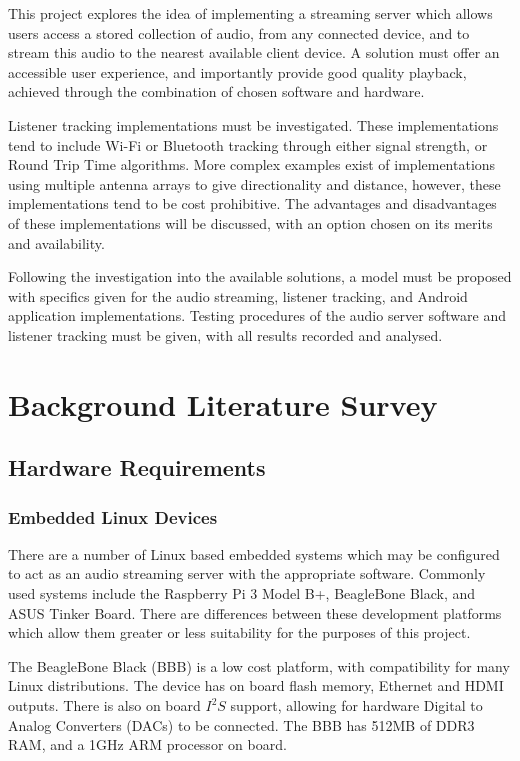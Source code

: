 \documentclass[11pt,a4paper,headinclude=false,footinclude=false]{scrreprt}
\begin{document}
This project explores the idea of implementing a streaming server which
allows users access a stored collection of audio, from any connected
device, and to stream this audio to the nearest available client device.
A solution must offer an accessible user experience, and importantly
provide good quality playback, achieved through the combination of
chosen software and hardware.

Listener tracking implementations must be investigated. These
implementations tend to include Wi-Fi or Bluetooth tracking through
either signal strength, or Round Trip Time algorithms. More complex
examples exist of implementations using multiple antenna arrays to give
directionality and distance, however, these implementations tend to be
cost prohibitive. The advantages and disadvantages of these
implementations will be discussed, with an option chosen on its merits
and availability.

Following the investigation into the available solutions, a model must
be proposed with specifics given for the audio streaming, listener
tracking, and Android application implementations. Testing procedures of
the audio server software and listener tracking must be given, with all
results recorded and analysed.

\chapter{Background Literature
Survey}\label{background-literature-survey}

\section{Hardware Requirements}\label{hardware-requirements}

\subsection{Embedded Linux Devices}\label{embedded-linux-devices}

There are a number of Linux based embedded systems which may be
configured to act as an audio streaming server with the appropriate
software. Commonly used systems include the Raspberry Pi 3 Model B+,
BeagleBone Black, and ASUS Tinker Board. There are differences between
these development platforms which allow them greater or less suitability
for the purposes of this project.

The BeagleBone Black (BBB) is a low cost platform, with compatibility
for many Linux distributions. The device has on board flash memory,
Ethernet and HDMI outputs. There is also on board \(I^2S\) support,
allowing for hardware Digital to Analog Converters (DACs) to be
connected. The BBB has 512MB of DDR3 RAM, and a 1GHz ARM processor on
board\cite{BBB18}.
\end{document}
